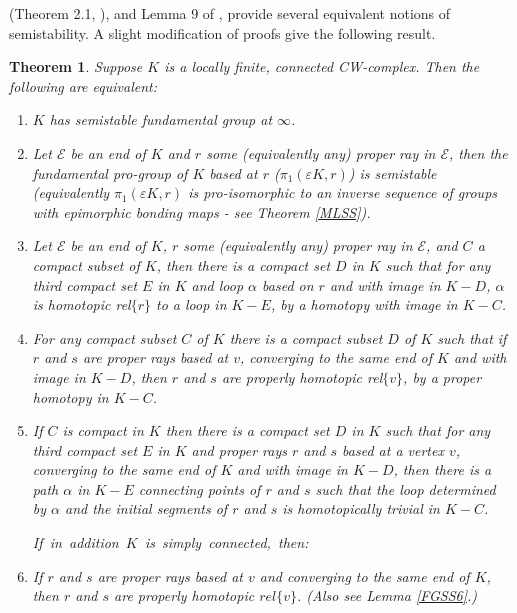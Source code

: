 \documentclass[12pt]{article}
\newtheorem{theorem}{Theorem}[subsection]
\begin{document}
(Theorem 2.1, \cite{M1}), and Lemma 9 of \cite{M86},  provide several equivalent notions of semistability. A slight modification of proofs give the following result.

\begin{theorem}\label{ssequiv} 
Suppose $K$ is a locally finite, connected CW-complex. Then the following are equivalent:
\begin{enumerate}
\item $K$ has  semistable fundamental group at $\infty$.
\item Let $\mathcal E$ be an end of $K$ and $r$ some 
(equivalently any) proper ray in $\mathcal E$, then the fundamental pro-group of $K$ based at $r$ ($\pi_1(\varepsilon K,r)$) is semistable (equivalently $\pi_1(\varepsilon K,r)$ is pro-isomorphic to an inverse sequence of groups with epimorphic bonding maps - see Theorem \ref{MLSS}). 
\item Let $\mathcal E$ be an end of $K$, $r$ some 
(equivalently any) proper ray in $\mathcal E$, and $C$ a compact subset of $K$, then there is a compact set $D$ in $K$ such that for any third compact set $E$ in $K$ and loop $\alpha$ based on $r$ and with image in $K-D$, $\alpha$ is homotopic rel$\{r\}$ to a loop in $K-E$, by a homotopy with image in $K-C$. 
\item For any compact subset $C$ of $K$ there is a compact subset $D$ of $K$ such that if $r$ and $s$ are proper rays based at $v$, converging to the same end of $K$ and with image in $K-D$, then $r$ and $s$ are properly homotopic rel$\{v\}$, by a proper homotopy in $K-C$. 
\item If $C$ is compact in $K$ then there is a compact set $D$ in $K$ such that for
any third compact set $E$ in $K$ and proper rays $r$ and $s$ based at a vertex $v$, converging to the same end of $K$ and with
image in $K-D$, then there is a path $\alpha$ in $K-E$ connecting points of $r$ and
$s$ such that the loop determined by $\alpha$ and the initial segments of $r$
and $s$ is homotopically trivial in $K-C$.

\medskip

\hbox{If in addition $K$ is simply connected, then:}

\item If $r$ and $s$ are proper rays based at $v$ and converging to the same end of $K$, then
$r$ and $s$ are properly homotopic $rel\{v\}$. (Also see Lemma \ref{FGSS6}.)
\end{enumerate}
\end{theorem}
\end{document}
